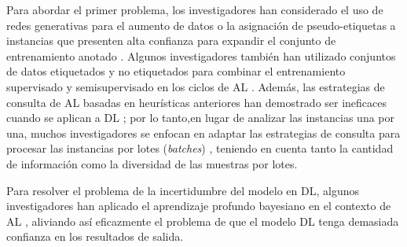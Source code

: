 Para abordar el primer problema, los investigadores han considerado el uso de redes generativas para el aumento de datos \cite{tran2019bayesian} o la asignación de pseudo-etiquetas a instancias que presenten alta confianza para expandir el conjunto de entrenamiento anotado \cite{wang2017cost}. Algunos investigadores también han utilizado conjuntos de datos etiquetados y no etiquetados para combinar el entrenamiento supervisado y semisupervisado en los ciclos de AL \cite{hossain2019active, simeoni2020rethinking}. Además, las estrategias de consulta de AL basadas en heurísticas anteriores han demostrado ser ineficaces cuando se aplican a DL \cite{sener2018coreset}; por lo tanto,en lugar de analizar las instancias una por una, muchos investigadores se enfocan en adaptar las estrategias de consulta para procesar las instancias por lotes (\textit{batches}) \cite{ash2020deep, gissin2019discriminative, kirsch2019batchbald, zhdanov2019diverse}, teniendo en cuenta tanto la cantidad de información como la diversidad de las muestras por lotes. 



Para resolver el problema de la incertidumbre del modelo en DL, algunos investigadores han aplicado el aprendizaje profundo bayesiano en el contexto de AL \cite{gal2017deep, pop2018deep,kirsch2019batchbald}, aliviando así eficazmente
el problema de que el modelo DL tenga demasiada confianza en los resultados de salida. 


